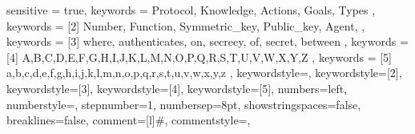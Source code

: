 \usepackage{listings}
\usepackage{xcolor}


 {
    sensitive = true,
    keywords = {
        Protocol, Knowledge, Actions, Goals, Types
    },
    keywords = [2]{
        Number, Function, Symmetric\_key, Public\_key, Agent,
    },
    keywords = [3]{
        where, authenticates, on, secrecy, of, secret, between
    },
    keywords = [4]{
        A,B,C,D,E,F,G,H,I,J,K,L,M,N,O,P,Q,R,S,T,U,V,W,X,Y,Z
    },
    keywords = [5]{
        a,b,c,d,e,f,g,h,i,j,k,l,m,n,o,p,q,r,s,t,u,v,w,x,y,z
    },
    keywordstyle=\color{keywords1},%
    keywordstyle=[2]\color{keywords2},
    keywordstyle=[3]\color{keywords3},
    keywordstyle=[4]\color{keywords4},
    keywordstyle=[5]\color{keywords5},
    numbers=left,
    numberstyle=\scriptsize,
    stepnumber=1,
    numbersep=8pt,
    showstringspaces=false,
    breaklines=false,
    comment=[l]{\#},
    commentstyle=\color{linecomments},
}

